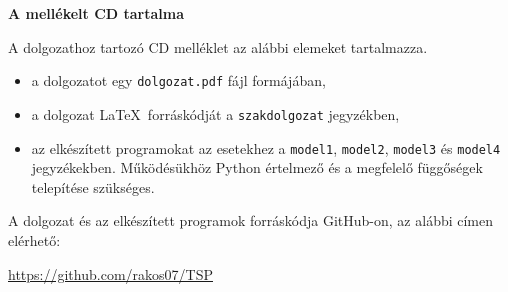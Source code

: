 \pagestyle{empty}

\noindent \textbf{\Large A mellékelt CD tartalma}

\vskip 1cm

A dolgozathoz tartozó CD melléklet az alábbi elemeket tartalmazza.
\begin{itemize}
\item a dolgozatot egy \texttt{dolgozat.pdf} fájl formájában,
\item a dolgozat \LaTeX\ forráskódját a \texttt{szakdolgozat} jegyzékben,
\item az elkészített programokat az esetekhez a \texttt{model1}, \texttt{model2}, \texttt{model3} és \texttt{model4} jegyzékekben. Működésükhöz Python értelmező és a megfelelő függőségek telepítése szükséges.
\end{itemize}

\noindent A dolgozat és az elkészített programok forráskódja GitHub-on, az alábbi címen elérhető:

\medskip

\url{https://github.com/rakos07/TSP}
